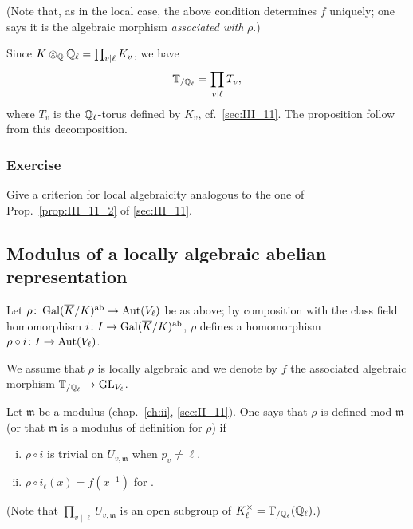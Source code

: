 (Note that, as in the local case, the above condition determines $f$ uniquely;
one says it is the algebraic morphism \emph{associated with} $\rho$.)

Since $K \otimes_{\mathbb{Q}} \mathbb{Q}_\ell = \prod_{v \mid \ell} K_v$, we have 
\[
\mathbb{T}_{/\mathbb{Q}_\ell} = \prod_{v \mid \ell} T_v,
\]
where $T_v$ is the $\mathbb{Q}_\ell$-torus defined by $K_v$, cf.~\ref{sec:III_11}. The 
proposition follow from this decomposition. 

\subsubsection*{Exercise}
Give a criterion for local algebraicity analogous to the one of
Prop.~\ref{prop:III_11_2} of \ref{sec:III_11}.

\subsection{Modulus of a locally algebraic abelian representation}
\label{sec:III_22}
Let $\rho\colon \operatorname{Gal}(\overline{K}/K)^{\mathrm{ab}} \to \operatorname{Aut}(V_\ell)$ be as above; by
composition with the class field homomorphism $i\colon I \to \operatorname{Gal}(\overline{K}/K)^{\mathrm{ab}}$, $\rho$ defines a homomorphism $\rho \circ i\colon I \to \operatorname{Aut}(V_\ell)$.

We assume that $\rho$ is locally algebraic and we denote by $f$ the associated
\dpage
algebraic morphism $\mathbb{T}_{/\mathbb{Q}_\ell} \to \operatorname{GL}_{V_\ell}$.
\begin{mydef}
Let $\mathfrak{m}$ be a modulus (chap.~\ref{ch:ii}, \ref{sec:II_11}).
One says that $\rho$ is defined mod $\mathfrak{m}$ (or that
$\mathfrak{m}$ is a modulus of definition for $\rho$) if
\begin{enumerate}[(i)]
	\item $\rho \circ i$ is trivial on $U_{v, \mathfrak{m}}$ when $p_v \ne
		\ell$.
	\item $\rho \circ i_\ell(x) = f(x^{-1})$ for .
\end{enumerate}
\end{mydef}
(Note that $\prod_{v\mid\ell} U_{v, \mathfrak{m}}$ is an open subgroup of
$K_\ell^\times = \mathbb{T}_{/\mathbb{Q}_\ell}(\mathbb{Q}_\ell)$.)

